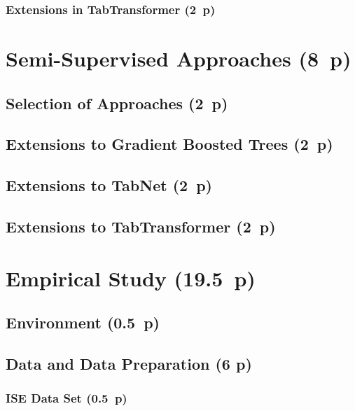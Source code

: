 \subsubsection{Extensions in
  TabTransformer (2~p)}\label{extensions-in-tabtransformer}

\newpage
\section{Semi-Supervised Approaches (8~p)}\label{semi-supervised-approaches}

\subsection{Selection of Approaches (2~p)}\label{selection-of-approaches-1}

\subsection{Extensions to Gradient Boosted
  Trees (2~p)}\label{extensions-to-gradient-boosted-trees}

\subsection{Extensions to TabNet (2~p)}\label{extensions-to-tabnet}

\subsection{Extensions to
  TabTransformer (2~p)}\label{extensions-to-tabtransformer}

\newpage
\section{Empirical Study (19.5~p)}\label{empirical-study}

\subsection{Environment (0.5~p)}\label{environment}

\subsection{Data and Data Preparation (6 p)}\label{data-and-data-preparation}

\subsubsection{ISE Data Set (0.5~p)}\label{ise-data-set}

